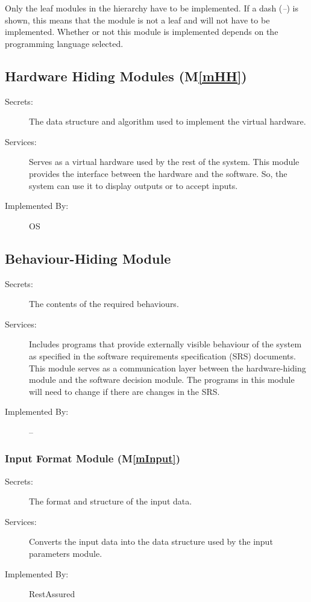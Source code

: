 \documentclass[12pt, titlepage]{article}
\newcommand{\mref}[1]{M\ref{#1}}
\begin{document}
Only the leaf modules in the
hierarchy have to be implemented. If a dash (\emph{--}) is shown, this means
that the module is not a leaf and will not have to be implemented. Whether or
not this module is implemented depends on the programming language
selected.


\subsection{Hardware Hiding Modules (\mref{mHH})}
\begin{description}
\item[Secrets:]The data structure and algorithm used to implement the virtual
  hardware.
\item[Services:]Serves as a virtual hardware used by the rest of the
  system. This module provides the interface between the hardware and the
  software. So, the system can use it to display outputs or to accept inputs.
\item[Implemented By:] OS
\end{description}


\subsection{Behaviour-Hiding Module}
\begin{description}
\item[Secrets:]The contents of the required behaviours.
\item[Services:]Includes programs that provide externally visible behaviour of
  the system as specified in the software requirements specification (SRS)
  documents. This module serves as a communication layer between the
  hardware-hiding module and the software decision module. The programs in this
  module will need to change if there are changes in the SRS.
\item[Implemented By:] --
\end{description}


\subsubsection{Input Format Module (\mref{mInput})}
\begin{description}
\item[Secrets:]The format and structure of the input data.
\item[Services:]Converts the input data into the data structure used by the
  input parameters module.
\item[Implemented By:] RestAssured
\end{description}
\end{document}
